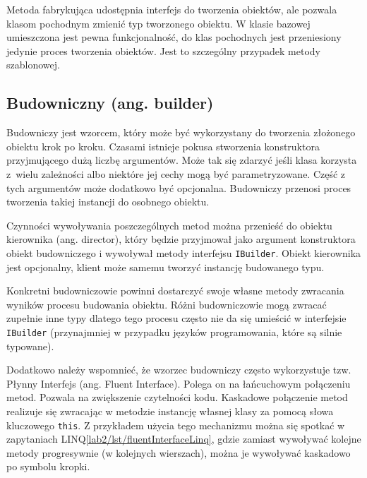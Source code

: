 Metoda fabrykująca udostępnia interfejs do tworzenia obiektów, ale pozwala klasom pochodnym zmienić typ tworzonego obiektu. W klasie bazowej umieszczona jest pewna funkcjonalność, do klas pochodnych jest przeniesiony jedynie proces tworzenia obiektów. Jest to szczególny przypadek metody szablonowej.
%	
%
%

\subsection{Budowniczny (ang. builder)}\label{lab2/sec/builderPattern}
Budowniczy jest wzorcem, który może być wykorzystany do tworzenia złożonego obiektu krok po kroku. Czasami istnieje pokusa stworzenia konstruktora przyjmującego dużą liczbę argumentów. Może tak się zdarzyć jeśli klasa korzysta z~wielu zależności albo niektóre jej cechy mogą być parametryzowane. Część z tych argumentów może dodatkowo być opcjonalna. Budowniczy przenosi proces tworzenia takiej instancji do osobnego obiektu. 

Czynności wywoływania poszczególnych metod można przenieść do obiektu kierownika (ang. director), który będzie przyjmował jako argument konstruktora obiekt budowniczego i wywoływał metody interfejsu \texttt{IBuilder}. Obiekt kierownika jest opcjonalny, klient może samemu tworzyć instancję budowanego typu. 

Konkretni budowniczowie powinni dostarczyć swoje własne metody zwracania wyników procesu budowania obiektu. Różni budowniczowie mogą zwracać zupełnie inne typy dlatego tego procesu często nie da się umieścić w interfejsie \texttt{IBuilder} (przynajmniej w przypadku języków programowania, które są silnie typowane). 
 
Dodatkowo należy wspomnieć, że wzorzec budowniczy często wykorzystuje tzw. Płynny Interfejs (ang. Fluent Interface). Polega on na łańcuchowym połączeniu metod. Pozwala na zwiększenie czytelności kodu. Kaskadowe połączenie metod realizuje się zwracając w metodzie instancję własnej klasy za pomocą słowa kluczowego \texttt{this}. Z przykładem użycia tego mechanizmu można się spotkać w zapytaniach LINQ\ref{lab2/lst/fluentInterfaceLinq}, gdzie zamiast wywoływać kolejne metody progresywnie (w kolejnych wierszach), można je wywoływać kaskadowo po symbolu kropki. 

